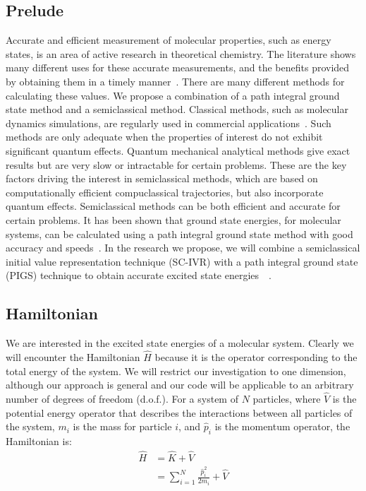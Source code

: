 \documentclass[12pt,letterpaper,oneside,final,titlepage]{article}               %
\numberwithin{equation}{section} %
\begin{document}
\subsection{Prelude}
Accurate and efficient measurement of molecular properties, such as energy states, is an area of active research in theoretical chemistry. 
The literature shows many different uses for these accurate measurements, and the benefits provided by obtaining them in a timely manner~\cite{goodfellow1990molecular}. 
There are many different methods for calculating these values. 
We propose a combination of a path integral ground state method and a semiclassical method. 
Classical methods, such as molecular dynamics simulations, are regularly used in commercial applications~\cite{pasquarello1998interface}. 
Such methods are only adequate when the properties of interest do not exhibit significant quantum effects. 
Quantum mechanical analytical methods give exact results but are very slow or intractable for certain problems. 
These are the key factors driving the interest in semiclassical methods, which are based on computationally efficient compuclassical trajectories, but also incorporate quantum effects. 
Semiclassical methods can be both efficient and accurate for certain problems. \newline
It has been shown that ground state energies, for molecular systems, can be calculated using a path integral ground state method with good accuracy and speeds~\cite{sarsa2000path}. 
In the research we propose, we will combine a semiclassical initial value representation technique (SC-IVR) with a path integral 
ground state (PIGS) technique to obtain accurate excited state energies~\cite{issack2007semiclassical}~\cite{schmidt2014inclusion}.

\newpage

\subsection{Hamiltonian}
We are interested in the excited state energies of a molecular system.
Clearly we will encounter the Hamiltonian $\hat{H}$ because it is the operator corresponding to the total energy of the system.
We will restrict our investigation to one dimension, although our approach is general and our code will be applicable
to an arbitrary number of degrees of freedom (d.o.f.).
For a system of $N$ particles, where $\hat{V}$ is the potential energy operator that describes the interactions between 
all particles of the system, $m_{i}$ is the mass for particle $i$, and $\hat{p}_{i}$ is the momentum operator, the Hamiltonian is:
\begin{align}
    \hat{H} &= \hat{K} + \hat{V}
    \\      &= \sum_{i=1}^{N}\frac{\hat{p}_{i}^2}{2m_{i}} + \hat{V}
\end{align}
\end{document}
